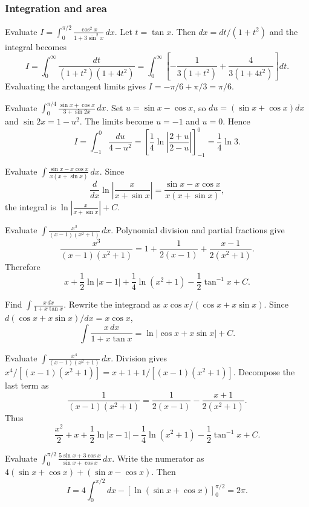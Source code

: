\subsubsection{Integration and area}
\begin{enumerate}[label={},leftmargin=0pt,itemsep=9pt]
 Evaluate $\displaystyle I=\int_0^{\pi/2}\frac{\cos^2x}{1+3\sin^2x}\,dx$.
\solution Let $t=\tan x$. Then $dx=dt/(1+t^2)$ and the integral becomes
\[
I=\int_0^\infty\frac{dt}{(1+t^2)(1+4t^2)}=\int_0^\infty\left[-\frac1{3(1+t^2)}+\frac4{3(1+4t^2)}\right]dt.
\]
Evaluating the arctangent limits gives $I=-\pi/6+\pi/3=\boxed{\pi/6}$.

 Evaluate $\displaystyle\int_0^{\pi/4}\frac{\sin x+\cos x}{3+\sin2x}\,dx$.
\solution Set $u=\sin x-\cos x$, so $du=(\sin x+\cos x)dx$ and $\sin2x=1-u^2$. The limits become $u=-1$ and $u=0$. Hence
\[
I=\int_{-1}^{0}\frac{du}{4-u^2}=\left[\frac14\ln\left|\frac{2+u}{2-u}\right|\right]_{-1}^{0}=\boxed{\frac14\ln3}.
\]

 Evaluate $\displaystyle\int\frac{\sin x-x\cos x}{x(x+\sin x)}\,dx$.
\solution Since
\[
\frac{d}{dx}\ln\left|\frac{x}{x+\sin x}\right|=\frac{\sin x-x\cos x}{x(x+\sin x)},
\]
the integral is $\boxed{\ln\left|\frac{x}{x+\sin x}\right|+C}$.

 Evaluate $\displaystyle\int\frac{x^3}{(x-1)(x^2+1)}\,dx$.
\solution Polynomial division and partial fractions give
\[
\frac{x^3}{(x-1)(x^2+1)}=1+\frac1{2(x-1)}+\frac{x-1}{2(x^2+1)}.
\]
Therefore
\[
\boxed{x+\frac12\ln|x-1|+\frac14\ln(x^2+1)-\frac12\tan^{-1}x+C}.
\]

 Find $\displaystyle\int\frac{x\,dx}{1+x\tan x}$.
\solution Rewrite the integrand as $x\cos x/(\cos x+x\sin x)$. Since $d(\cos x+x\sin x)/dx=x\cos x$,
\[
\boxed{\int\frac{x\,dx}{1+x\tan x}=\ln|\cos x+x\sin x|+C}.
\]

 Evaluate $\displaystyle\int\frac{x^4}{(x-1)(x^2+1)}\,dx$.
\solution Division gives $x^4/[(x-1)(x^2+1)]=x+1+1/[(x-1)(x^2+1)]$. Decompose the last term as
\[
\frac1{(x-1)(x^2+1)}=\frac1{2(x-1)}-\frac{x+1}{2(x^2+1)}.
\]
Thus
\[
\boxed{\frac{x^2}{2}+x+\frac12\ln|x-1|-\frac14\ln(x^2+1)-\frac12\tan^{-1}x+C}.
\]

 Evaluate $\displaystyle\int_0^{\pi/2}\frac{5\sin x+3\cos x}{\sin x+\cos x}\,dx$.
\solution Write the numerator as $4(\sin x+\cos x)+(\sin x-\cos x)$. Then
\[
I=4\int_0^{\pi/2}dx-\left[\ln(\sin x+\cos x)\right]_0^{\pi/2}=\boxed{2\pi}.
\]


\end{enumerate}
